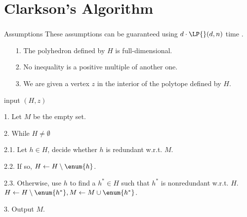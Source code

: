 \section{Clarkson's Algorithm}
\begin{frame}\frametitle{\insertsection}\justifying
\begin{ebox}{Assumptions}
These assumptions can be guaranteed using \(d\cdot\LP{}(d,n)\) time
\cite{fukuda:2015}.
\begin{itemize}
\item[{\color{SpringGreen4}1.}] The polyhedron defined by \(H\) is full-dimensional.
\item[{\color{SpringGreen4}2.}] No inequality is a positive multiple of another one.
\item[{\color{SpringGreen4}3.}] We are given a vertex \(z\) in the interior of the polytope defined by \(H\).
\end{itemize}
\end{ebox}
\begin{algo}
\item[input] \((H, z)\)
\item[1.] Let \(M\) be the empty set.
\item[2.] While \(H \neq \emptyset\)
\item[2.1.] Let \(h \in H\), decide whether \(h\) is redundant w.r.t. \(M\).
\item[2.2.] If so, \(H \gets H \setminus \enum{h}\).
\item[2.3.] Otherwise, use \(h\) to find a \(h^* \in H\) such that \(h^*\) is
nonredundant w.r.t. \(H\). \(H \gets H \setminus \enum{h^*}, M
\gets M \cup \enum{h^*}\).
\item[3.] Output \(M\).
\end{algo}
\end{frame}

